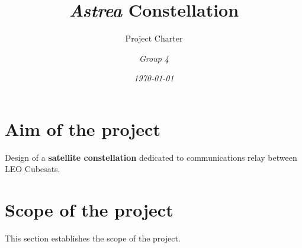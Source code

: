 \documentclass[12pt, titlepage]{scrartcl}
\title{\textbf{\textit{Astrea}} Constellation }
\subtitle{Project Charter \vspace{7cm}}
\author{\emph{Group 4}}
\date{\textit{\today}}
\begin{document}
\maketitle
\tableofcontents
\pagebreak
\pagebreak


\section{Aim of the project}
Design of a \textbf{satellite constellation} dedicated to  communications relay between LEO Cubesats. 


\section{Scope of the project}
This section establishes the scope of the project.
\end{document}
